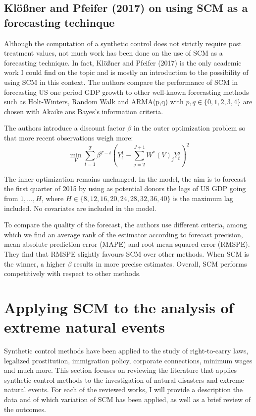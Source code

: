 \documentclass[12pt,a4paper,draft]{article}
\begin{document}
\subsection{Klößner and Pfeifer (2017) on using SCM as a forecasting techinque}
Although the computation of a synthetic control does not strictly require post treatment
values, not much work has been done on the use of SCM as a forecasting technique.
In fact, Klößner and Pfeifer (2017) is the only academic work I could find on the 
topic and is mostly an introduction to the possibility of using SCM in this context. 
The authors compare the performance of SCM in forecasting US one period GDP growth 
to other well-known forecasting methods such as Holt-Winters, Random Walk and 
ARMA(p,q) with $p,q\in\{ 0,1,2,3,4\}$ are chosen with Akaike ans Bayes's information 
criteria.

The authors introduce a discount factor $\beta$ in the outer optimization problem 
so that more recent observations weigh more:
\begin{equation}
    \min_{V} 
    \sum_{t=1}^{T} {\beta^{T-t} \left( Y^1_t - 
    \sum_{j=2}^{J+1} {W^*(V)_j Y^j_t} \right)^2}
\end{equation}

The inner optimization remains unchanged. 
In the model, the aim is to forecast the first quarter of 2015 by using as 
potential donors the lags of US GDP going 
from $1, \dots, H$, where $H\in\{8,12,16,20,24,28,32,36,40\}$ is 
the maximum lag included. No covariates are included in the model. 

To compare the quality of the forecast, the authors use different criteria, among 
which we find an average rank of the estimator according to forecast precision,
mean absolute prediction error (MAPE) and root mean squared error (RMSPE).
They find that RMSPE slightly favours SCM over other methods. When SCM is the 
winner, a higher $\beta$ results in more precise estimates. Overall, SCM performs 
competitively with respect to other methods. 









\section{Applying SCM to the analysis of extreme natural events}
Synthetic control methods have been applied to the study of right-to-carry laws, 
legalized prostitution, immigration policy, corporate connections, minimum wages and 
much more. This section focuses on reviewing the literature that applies synthetic 
control methods to the investigation of natural disasters and extreme natural 
events. For each of the reviewed works, I will provide a description the data 
and of which variation of SCM has been applied, as well as a brief review of 
the outcomes. 
\end{document}
